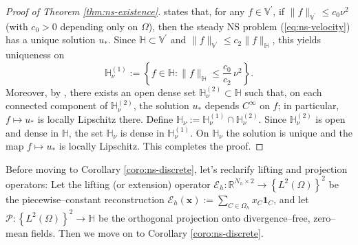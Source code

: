 \documentclass{amsart} %
\def\eqref#1{equation~\ref{#1}}
\def\vone{{\bm{1}}}
\def\vx{{\bm{x}}}
\def\sH{{\mathbb{H}}}
\def\sR{{\mathbb{R}}}
\def\sV{{\mathbb{V}}}
\def\cE{{\mathcal{E}}}
\def\cP{{\mathcal{P}}}
\theoremstyle{definition}
\theoremstyle{remark}
\renewcommand{\eqref}[1]{\textup{(\ref{#1})}}
\begin{document}
\begin{proof}[Proof of Theorem \ref{thm:ns-existence}]
\cite[Theorem 10.1]{temam1995navier} states that, for any $f \in \sV^\prime$, if $\|f\|_{\sV^\prime} \le c_0 \nu^2$ (with $c_0>0$ depending only on $\Omega$), then the steady NS problem \eqref{eq:ns-velocity} has a unique solution $u_\ast$.
Since $\sH \subset \sV^\prime$ and $\|f\|_{\sV^\prime} \le c_2 \|f\|_{\sH}$, this yields uniqueness on
\[
\sH_{\nu}^{(1)} := \left\{ f \in \sH : \|f\|_{\sH} \le \frac{c_0}{c_2}\,\nu^2 \right\}.
\]
Moreover, by \cite[Theorem 10.4]{temam1995navier}, there exists an open dense set $\sH_{\nu}^{(2)} \subset \sH$ such that, on each connected component of $\sH_{\nu}^{(2)}$, the solution $u_\ast$ depends $C^\infty$ on $f$; in particular, $f \mapsto u_\ast$ is locally Lipschitz there.
Define $\sH_{\nu}:=\sH_{\nu}^{(1)} \cap \sH_{\nu}^{(2)}$. Since $\sH_{\nu}^{(2)}$ is open and dense in $\sH$, the set $\sH_{\nu}$ is dense in $\sH_{\nu}^{(1)}$. On $\sH_{\nu}$ the solution is unique and the map $f \mapsto u_\ast$ is locally Lipschitz. This completes the proof.
\end{proof}

Before moving to Corollary \ref{coro:ns-discrete}, let's reclarify lifting and projection operators: Let the lifting (or extension) operator $\cE_h: \sR^{N_h \times 2} \to \left\{L^2(\Omega)\right\}^2 $ be the piecewise–constant reconstruction $\cE_h(\vx):= \sum_{C \in \Omega_h} x_C \vone_{C}$, and let $\cP: \left\{L^2(\Omega)\right\}^2 \to \sH$ be the orthogonal projection onto divergence–free, zero–mean fields. Then we move on to Corollary \ref{coro:ns-discrete}.
\end{document}
